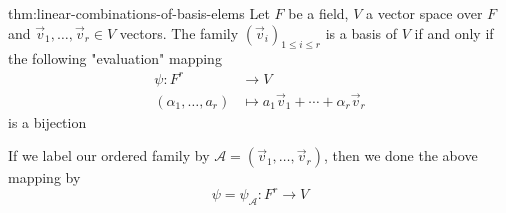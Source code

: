 \documentclass{article}
\begin{document}
\begin{thm}{thm:linear-combinations-of-basis-elems}{}
    Let $F$ be a field, $V$ a vector space over $F$ and $\vec{v}_{1},\dots,\vec{v}_{r}\in V$ vectors. The family $(\vec{v}_{i})_{1\le i\le r}$ is a basis of $V$ if and only if the following "evaluation" mapping
    \begin{align*}
        \psi : F^{r} &\to V\\
        (\alpha_{1},\dots,a_{r}) &\mapsto a_{1}\vec{v}_{1} + \cdots + \alpha_{r}\vec{v}_{r}
    \end{align*}
    is a bijection

    If we label our ordered family by $\mathcal{A} = (\vec{v}_{1},\dots,\vec{v}_{r})$, then we done the above mapping by
    \[\psi = \psi_{\mathcal{A}} : F^{r}\to V\]
\end{thm}
\end{document}

